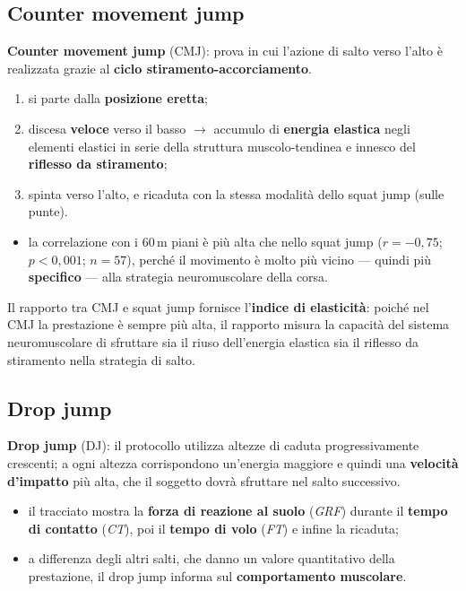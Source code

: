 \subsection{Counter movement jump}

\textbf{Counter movement jump} (CMJ): prova in cui l'azione di salto verso l'alto è realizzata
grazie al \textbf{ciclo stiramento-accorciamento}.

\begin{enumerate}
  \item si parte dalla \textbf{posizione eretta};
  \item discesa \textbf{veloce} verso il basso $\rightarrow$ accumulo di \textbf{energia elastica}
    negli elementi elastici in serie della struttura muscolo-tendinea e innesco del \textbf{riflesso
    da stiramento};
  \item spinta verso l'alto, e ricaduta con la stessa modalità dello squat jump (sulle punte).
\end{enumerate}

\begin{itemize}
  \item la correlazione con i 60\,m piani è più alta che nello squat jump ($r = -0,75$; $p < 0,001$;
    $n = 57$), perché il movimento è molto più vicino --- quindi più \textbf{specifico} --- alla
    strategia neuromuscolare della corsa.
\end{itemize}

Il rapporto tra CMJ e squat jump fornisce l'\textbf{indice di elasticità}: poiché nel CMJ
la prestazione è sempre più alta, il rapporto misura la capacità del sistema neuromuscolare di
sfruttare sia il riuso dell'energia elastica sia il riflesso da stiramento nella strategia
di salto.

\subsection{Drop jump}

\textbf{Drop jump} (DJ): il protocollo utilizza altezze di caduta progressivamente crescenti; a ogni
  altezza corrispondono un'energia maggiore e quindi una \textbf{velocità d'impatto} più alta, che
  il soggetto dovrà sfruttare nel salto successivo.

\begin{itemize}
  \item il tracciato mostra la \textbf{forza di reazione al suolo} (\textit{GRF}) durante il
    \textbf{tempo di contatto} (\textit{CT}), poi il \textbf{tempo di volo} (\textit{FT}) e infine
    la ricaduta;
  \item a differenza degli altri salti, che danno un valore quantitativo della prestazione,
    il drop jump informa sul \textbf{comportamento muscolare}.
\end{itemize}

